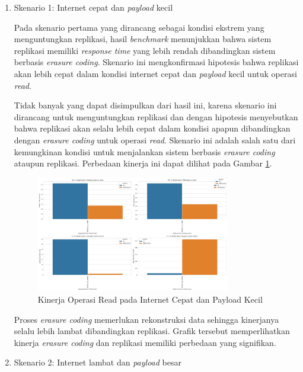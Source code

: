 \begin{enumerate}
  \item Skenario 1: Internet cepat dan \textit{payload} kecil
  
  Pada skenario pertama yang dirancang sebagai kondisi ekstrem yang menguntungkan replikasi, hasil \textit{benchmark} menunjukkan bahwa sistem replikasi memiliki \textit{response time} yang lebih rendah dibandingkan sistem berbasis \textit{erasure coding}. Skenario ini mengkonfirmasi hipotesis bahwa replikasi akan lebih cepat dalam kondisi internet cepat dan \textit{payload} kecil untuk operasi \textit{read}.
  
  Tidak banyak yang dapat disimpulkan dari hasil ini, karena skenario ini dirancang untuk menguntungkan replikasi dan dengan hipotesis menyebutkan bahwa replikasi akan selalu lebih cepat dalam kondisi apapun dibandingkan dengan \textit{erasure coding} untuk operasi \textit{read}. Skenario ini adalah salah satu dari kemungkinan kondisi untuk menjalankan sistem berbasis \textit{erasure coding} ataupun replikasi. Perbedaan kinerja ini dapat dilihat pada Gambar \ref{fig:read-smload-fastnet}.

  \begin{figure}[ht]
    \centering
    \includegraphics[width=0.8\textwidth]{resources/chapter-4/read_smload_fastnet.png}

    \caption{Kinerja Operasi Read pada Internet Cepat dan Payload Kecil}
      \label{fig:read-smload-fastnet}
  \end{figure}

  Proses \textit{erasure coding} memerlukan rekonstruksi data sehingga kinerjanya selalu lebih lambat dibandingkan replikasi. Grafik tersebut memperlihatkan kinerja \textit{erasure coding} dan replikasi memiliki perbedaan yang signifikan.

  \item Skenario 2: Internet lambat dan \textit{payload} besar
  

\end{enumerate}
